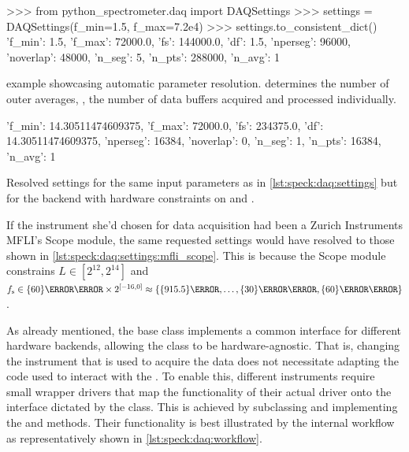 \begin{listing}[htpb]
    \begin{pycode}
        >>> from python_spectrometer.daq import DAQSettings
        >>> settings = DAQSettings(f_min=1.5, f_max=7.2e4)
        >>> settings.to_consistent_dict()
        {'f_min': 1.5,
         'f_max': 72000.0,
         'fs': 144000.0,
         'df': 1.5,
         'nperseg': 96000,
         'noverlap': 48000,
         'n_seg': 5,
         'n_pts': 288000,
         'n_avg': 1}
    \end{pycode}
    \caption{
         example showcasing automatic parameter resolution.
         determines the number of outer averages, \ie, the number of data buffers acquired and processed individually.
    }
    \label{lst:speck:daq:settings}
\end{listing}

\begin{marginlisting}[*-8]
    \begin{pycode}[fontsize=\footnotesize]
    {'f_min': 14.30511474609375,
     'f_max': 72000.0,
     'fs': 234375.0,
     'df': 14.30511474609375,
     'nperseg': 16384,
     'noverlap': 0,
     'n_seg': 1,
     'n_pts': 16384,
     'n_avg': 1}
    \end{pycode}
    \caption[Resolved  for MFLI Scope]{
        Resolved settings for the same input parameters as in \cref{lst:speck:daq:settings} but for the  backend with hardware constraints on  and .
    }
    \label{lst:speck:daq:settings:mfli_scope}
\end{marginlisting}

If the instrument she'd chosen for data acquisition had been a Zurich Instruments MFLI's Scope module,
the same requested settings would have resolved to those shown in \cref{lst:speck:daq:settings:mfli_scope}.
This is because the Scope module constrains $L\in[2^{12},2^{14}]$ and $\fs\in\qty{60}{\mega\hertz}\times 2^{[-16, 0]} \approx \allowbreak \lbrace \qty{915.5}{\hertz}, \allowbreak \dotsc, \allowbreak \qty{30}{\mega\hertz}, \qty{60}{\mega\hertz}\rbrace$.

As already mentioned, the  base class implements a common interface for different hardware backends, allowing the  class to be hardware-agnostic.
That is, changing the instrument that is used to acquire the data does not necessitate adapting the code used to interact with the .
To enable this, different instruments require small wrapper drivers that map the functionality of their actual driver onto the interface dictated by the  class.
This is achieved by subclassing  and implementing the  and  methods.
Their functionality is best illustrated by the internal workflow as representatively shown in \cref{lst:speck:daq:workflow}.

